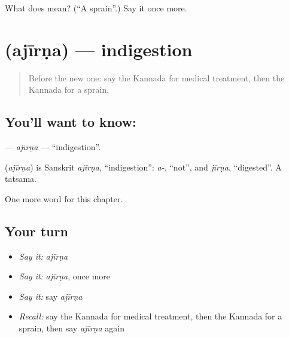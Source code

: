 \begin{tcolorbox}[breakable,colback=teal!4,colframe=teal!35!black,title={Before you move on}]
What does  mean? (\textquotedblleft{}A sprain\textquotedblright{}.) Say it once more.
\end{tcolorbox}
\section[\texorpdfstring{\kn{ಅಜೀರ್ಣ} (ajīrṇa)}{ಅಜೀರ್ಣ (ajīrṇa)}]{ (ajīrṇa) — indigestion}

\label{lesson:KA-C246-ajirna}



\begin{quote}
Before the new one: say the Kannada for medical treatment, then the Kannada for a sprain.
\end{quote}

\subsection*{You'll want to know: }
\textbf{} — \emph{ajīrṇa} — \textquotedblleft{}indigestion\textquotedblright{}.

\begin{cousinweb}
\textbf{} (\emph{ajīrṇa}) is Sanskrit \emph{ajīrṇa}, \textquotedblleft{}indigestion\textquotedblright{}: \emph{a-}, \textquotedblleft{}not\textquotedblright{}, and \emph{jīrṇa}, \textquotedblleft{}digested\textquotedblright{}. A tatsama.
\end{cousinweb}

\begin{grammarlens}[title={What you've built}]
One more word for this chapter.
\end{grammarlens}

\subsection*{Your turn}
\begin{itemize}
\raggedright
  \item \emph{Say it:} \emph{ajīrṇa}
  \item \emph{Say it:} \emph{ajīrṇa}, once more
  \item \emph{Say it:} say \emph{ajīrṇa}
  \item \emph{Recall:} say the Kannada for medical treatment, then the Kannada for a sprain, then say \emph{ajīrṇa} again
\end{itemize}

